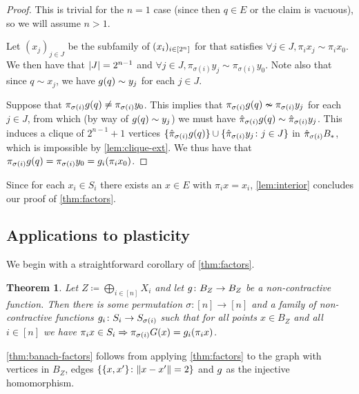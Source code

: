 \documentclass{amsart}
\newtheorem{theorem}{Theorem}[section]
\theoremstyle{definition}
\begin{document}
\begin{proof} 

  This is trivial for the $n=1$ case (since then $q \in E$ or the claim is vacuous), so we will assume $n > 1$.

  Let $(x_j)_{j \in J}$ be the subfamily of $(x_i)_{i \in [2^n]}$ for that satisfies $\forall j \in J, \pi_i x_j \sim \pi_i x_0$. We then have that $\abs{J} = 2^{n-1}$ and $\forall j \in J, \pi_{\sigma(i)}y_j \sim \pi_{\sigma(i)} y_0$. Note also that since $q \sim x_j$, we have $g(q) \sim y_j$ for each $j \in J$.

  Suppose that $\pi_{\sigma(i)} g(q) \neq \pi_{\sigma(i)} y_0$. This implies that $\pi_{\sigma(i)}g(q) \nsim \pi_{\sigma(i)}y_j$ for each $j \in J$, from which (by way of $g(q) \sim y_j$) we must have $\hat{\pi}_{\sigma(i)}g(q) \sim \hat{\pi}_{\sigma(i)}y_j$. This induces a clique of $2^{n-1}+1$ vertices $\{\hat{\pi}_{\sigma(i)}g(q)\} \cup \{\hat{\pi}_{\sigma(i)}y_j  \colon  j \in J\}$ in $\hat{\pi}_{\sigma(i)}B_*$, which is impossible by \autoref{lem:clique-ext}. We thus have that $\pi_{\sigma(i)} g(q) = \pi_{\sigma(i)}y_0 = g_i (\pi_i x_0)$.
\end{proof}
 

Since for each $x_i \in S_i$ there exists an $x \in E$ with $\pi_i x = x_i$, \autoref{lem:interior} concludes our proof of  \autoref{thm:factors}.


\subsection{Applications to plasticity}

We begin with a straightforward corollary of  \autoref{thm:factors}.

\begin{theorem} \label{thm:banach-factors}
\annotation  Let $Z \coloneqq \bigoplus_{i \in [n]} X_i$ and let $g \colon B_Z \to B_Z$ be a non-contractive function. Then there is some permutation $\sigma \colon [n] \to [n]$ and a family of non-contractive functions $g_i \colon S_i \to S_{\sigma(i)}$ such that for all points $x \in B_Z$ and all $i \in [n]$ we have 
  $\pi_i x \in S_i \Rightarrow \pi_{\sigma(i)} G(x) = g_i (\pi_i x)$.
\end{theorem}

\autoref{thm:banach-factors} follows from applying  \autoref{thm:factors} to the graph with vertices in $B_Z$, edges $\{\{x,x'\} \colon \norm{x-x'}=2\}$ and $g$ as the injective homomorphism.
\end{document}
